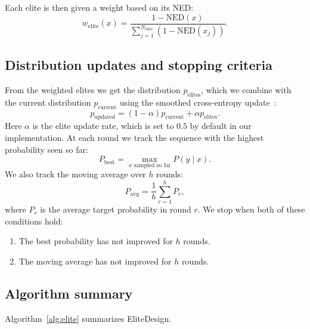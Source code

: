 Each elite is then given a weight based on its NED:
\begin{equation}
 w_{\mathrm{elite}}(x)=\frac{1-\mathrm{NED}(x)}
 {\sum_{j=1}^{N_{\mathrm{elite}}}(1-\mathrm{NED}(x_j))}.
 \label{eq:weights}
\end{equation}

\subsection{Distribution updates and stopping criteria}
From the weighted elites we get the distribution $p_{\mathrm{elites}}$, which we combine with
the current distribution $p_{\mathrm{current}}$ using the smoothed cross-entropy update~\citep{deboer2005}:
\begin{equation}
 p_{\mathrm{updated}}=(1-\alpha)p_{\mathrm{current}}
 +\alpha p_{\mathrm{elites}}.
 \label{eq:update}
\end{equation}
Here $\alpha$ is the elite update rate, which is set to 0.5 by
default in our implementation. At each round we track the sequence with the
highest probability seen so far:
\begin{equation}
 P_{\mathrm{best}}=\max_{x\text{ sampled so far}}P(y\mid x).
\end{equation}
We also track the moving average over $h$ rounds:
\begin{equation}
 P_{\mathrm{avg}}=\frac{1}{h}\sum_{r=1}^{h}P_r,
\end{equation}
where $P_r$ is the average target probability in round $r$.
We stop when both of these conditions hold:
\begin{enumerate}
\item The best probability has not improved for $h$ rounds.
\item The moving average has not improved for $h$ rounds.
\end{enumerate}

\subsection{Algorithm summary}
Algorithm~\ref{alg:elite} summarizes EliteDesign.


\FloatBarrier
